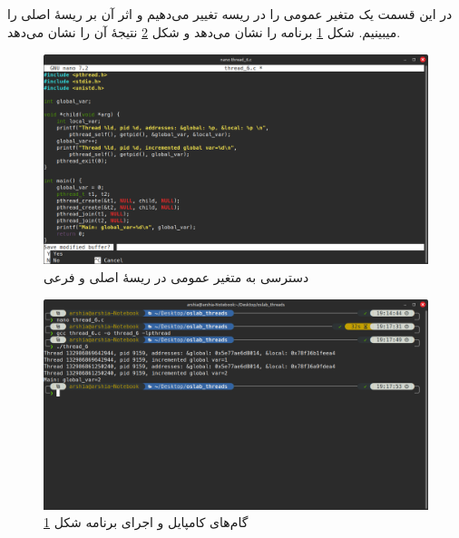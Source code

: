 \documentclass[12pt]{article}
\begin{document}
	\subsection{}
	در این قسمت یک متغیر عمومی را در ریسه تغییر می‌دهیم و اثر آن بر ریسهٔ اصلی را میبینیم. شکل \ref{img:11} برنامه را نشان می‌دهد و شکل \ref{img:12} نتیجهٔ آن را نشان می‌دهد.
	\begin{figure}[H]
		\centering
		\includegraphics[width=\textwidth]{report7-resources/11.png}
		\caption{دسترسی به متغیر عمومی در ریسهٔ اصلی و فرعی}
		\label{img:11}
	\end{figure}
	\begin{figure}[H]
		\centering
		\includegraphics[width=\textwidth]{report7-resources/12.png}
		\caption{گام‌های کامپایل و اجرای برنامه شکل \ref{img:11}}
		\label{img:12}
	\end{figure}
\end{document}
